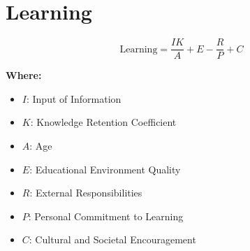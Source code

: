 \chapter{Learning}

\begin{equation}
\text{Learning} = \frac{IK}{A} + E - \frac{R}{P} + C
\end{equation}

\textbf{Where:}

\begin{itemize}
    \item $I$: Input of Information
    \item $K$: Knowledge Retention Coefficient
    \item $A$: Age
    \item $E$: Educational Environment Quality
    \item $R$: External Responsibilities
    \item $P$: Personal Commitment to Learning
    \item $C$: Cultural and Societal Encouragement
\end{itemize}